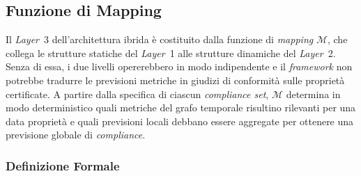 \subsection{Funzione di Mapping}
\label{sec:funzione_mapping}

Il \textit{Layer}~3 dell'architettura ibrida è costituito dalla funzione di \textit{mapping}
$\mathcal{M}$, che collega le strutture statiche del \textit{Layer}~1 alle strutture dinamiche
del \textit{Layer}~2. Senza di essa, i due livelli opererebbero in modo indipendente e il
\textit{framework} non potrebbe tradurre le previsioni metriche in giudizi di conformità sulle
proprietà certificate. A partire dalla specifica di ciascun \textit{compliance set}, $\mathcal{M}$
determina in modo deterministico quali metriche del grafo temporale risultino rilevanti per una
data proprietà e quali previsioni locali debbano essere aggregate per ottenere una previsione
globale di \textit{compliance}.

\subsubsection{Definizione Formale}
\label{sec:def_formale_mapping}

